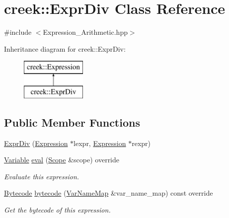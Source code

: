\hypertarget{classcreek_1_1_expr_div}{}\section{creek\+:\+:Expr\+Div Class Reference}
\label{classcreek_1_1_expr_div}


{\ttfamily \#include $<$Expression\+\_\+\+Arithmetic.\+hpp$>$}

Inheritance diagram for creek\+:\+:Expr\+Div\+:\begin{figure}[H]
\begin{center}
\leavevmode
\includegraphics[height=2.000000cm]{classcreek_1_1_expr_div}
\end{center}
\end{figure}
\subsection*{Public Member Functions}
\begin{DoxyCompactItemize}
\item 
\hyperlink{classcreek_1_1_expr_div_abcddfd3b785e4e0dc1d32ac5036983d2}{Expr\+Div} (\hyperlink{classcreek_1_1_expression}{Expression} $\ast$lexpr, \hyperlink{classcreek_1_1_expression}{Expression} $\ast$rexpr)
\item 
\hyperlink{classcreek_1_1_variable}{Variable} \hyperlink{classcreek_1_1_expr_div_a1fdc30ff0bca89f749073d3ebdd85040}{eval} (\hyperlink{classcreek_1_1_scope}{Scope} \&scope) override
\begin{DoxyCompactList}\small\item\em Evaluate this expression. \end{DoxyCompactList}\item 
\hyperlink{classcreek_1_1_bytecode}{Bytecode} \hyperlink{classcreek_1_1_expr_div_a520ad762fcfc1bcbcbd3c73ab2b2c62d}{bytecode} (\hyperlink{classcreek_1_1_var_name_map}{Var\+Name\+Map} \&var\+\_\+name\+\_\+map) const  override\hypertarget{classcreek_1_1_expr_div_a520ad762fcfc1bcbcbd3c73ab2b2c62d}{}\label{classcreek_1_1_expr_div_a520ad762fcfc1bcbcbd3c73ab2b2c62d}

\begin{DoxyCompactList}\small\item\em Get the bytecode of this expression. \end{DoxyCompactList}\end{DoxyCompactItemize}


